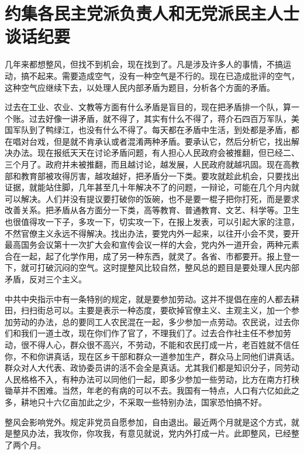 \section[约集各民主党派负责人和无党派民主人士谈话纪要 ]{约集各民主党派负责人和无党派民主人士谈话纪要 }


几年来都想整风，但找不到机会，现在找到了。凡是涉及许多人的事情，不搞运动，搞不起来。需要造成空气，没有一种空气是不行的。现在已造成批评的空气，这种空气应继续下去，以处理人民内部矛盾为题目，分析各个方面的矛盾。

过去在工业、农业、文教等方面有什么矛盾是盲目的，现在把矛盾排一个队，算一个账。过去好像一讲矛盾，就不得了，其实有什么不得了，蒋介石四百万军队，美国军队到了鸭绿江，也没有什么不得了。每天都在矛盾中生活，到处都是矛盾，都在唱对台戏，但是就不肯承认或者混淆两种矛盾。要承认它，然后分析它，找出解决办法。现在报纸天天在讨论矛盾问题，有人担心人民政府会被推翻，但已经二、三个月了。政府并未被推翻，而且越讨论，越发展，人民政府就越巩固。现在高教部和教育部被攻得厉害，越攻越好，把矛盾分一下类。要攻就趁此机会，只要找出证据，就能站住脚，几年甚至几十年解决不了的问题，一辩论，可能在几个月内就可以解决。人们并没有提议要打破你的饭碗，也不是要一棍子把你打死，而是要求改善关系。把矛盾从各方面分一下类，高等教育、普通教育、文艺、科学等。卫生也很值得攻一下子，多攻一下，切实攻一下，在报上发表，可以引起大家的注意，不然官僚主义永远不得解决。找出办法，要党内外一起来，以往开小会不灵，要开最高国务会议第十一次扩大会和宣传会议一样的大会，党内外一道开会，两种元素合在一起，起了化学作用，成了另一种东西，就灵了。各省、市都要开。报上登一下，就可打破沉闷的空气。这时提整风比较自然，整风总的题目是要处理人民内部矛盾，反对三个主义。

中共中央指示中有一条特别的规定，就是要参加劳动。这并不提倡在座的人都去耕田，扫扫街总可以。主要是表示一种态度，要砍掉官僚主义、主观主义，加一个参加劳动的办法，总的要同工人农民混在一起，多少参加一点劳动。农民说，过去你们和我们一道土改，现在你们作了官了，不理我们了。过去合作社主任不参加劳动，很不得人心，群众很不高兴，不劳动，不能和农民打成一片，老百姓就不信任你，不和你讲真话，现在区乡干部和群众一道参加生产，群众马上同他们讲真话。群众对人大代表、政协委员讲的活不会全是真话。尤其我们都是知识分子，同劳动人民格格不入，有种办法可以同他们一起，即多少参加一些劳动，比方在南方打秧锄草并不困难。当然，年老的有病的可以不去。我国有一特点，人口有六亿如此之多，耕地只十六亿亩加此之少，不采取一些特别办法，国家恐怕搞不好。

整风会影响党外。规定非党员自愿参加，自由退出。最近两个月就是这个方式，就是整风办法，我攻你，你攻我，有意见就说，党内外打成一片。此即整风，已经整了两个月。

